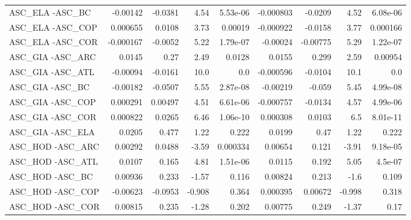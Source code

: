 \begin{tabular}{lrrrrrrrr}
ASC\_ELA -ASC\_BC                        &    -0.00142 &      -0.0381 &    4.54 & 5.53e-06 &  -0.000803 &     -0.0209 &         4.52 &      6.08e-06 \\
ASC\_ELA -ASC\_COP                       &    0.000655 &       0.0108 &    3.73 &  0.00019 &  -0.000922 &     -0.0158 &         3.77 &      0.000166 \\
ASC\_ELA -ASC\_COR                       &   -0.000167 &      -0.0052 &    5.22 & 1.79e-07 &   -0.00024 &    -0.00775 &         5.29 &      1.22e-07 \\
ASC\_GIA -ASC\_ARC                       &      0.0145 &         0.27 &    2.49 &   0.0128 &     0.0155 &       0.299 &         2.59 &       0.00954 \\
ASC\_GIA -ASC\_ATL                       &    -0.00094 &      -0.0161 &    10.0 &      0.0 &  -0.000596 &     -0.0104 &         10.1 &           0.0 \\
ASC\_GIA -ASC\_BC                        &    -0.00182 &      -0.0507 &    5.55 & 2.87e-08 &   -0.00219 &      -0.059 &         5.45 &      4.99e-08 \\
ASC\_GIA -ASC\_COP                       &    0.000291 &      0.00497 &    4.51 & 6.61e-06 &  -0.000757 &     -0.0134 &         4.57 &      4.99e-06 \\
ASC\_GIA -ASC\_COR                       &    0.000822 &       0.0265 &    6.46 & 1.06e-10 &   0.000308 &      0.0103 &          6.5 &      8.01e-11 \\
ASC\_GIA -ASC\_ELA                       &      0.0205 &        0.477 &    1.22 &    0.222 &     0.0199 &        0.47 &         1.22 &         0.222 \\
ASC\_HOD -ASC\_ARC                       &     0.00292 &       0.0488 &   -3.59 & 0.000334 &    0.00654 &       0.121 &        -3.91 &      9.18e-05 \\
ASC\_HOD -ASC\_ATL                       &      0.0107 &        0.165 &    4.81 & 1.51e-06 &     0.0115 &       0.192 &         5.05 &       4.5e-07 \\
ASC\_HOD -ASC\_BC                        &     0.00936 &        0.233 &   -1.57 &    0.116 &    0.00824 &       0.213 &         -1.6 &         0.109 \\
ASC\_HOD -ASC\_COP                       &    -0.00623 &      -0.0953 &  -0.908 &    0.364 &   0.000395 &     0.00672 &       -0.998 &         0.318 \\
ASC\_HOD -ASC\_COR                       &     0.00815 &        0.235 &   -1.28 &    0.202 &    0.00775 &       0.249 &        -1.37 &          0.17 \\

\end{tabular}
